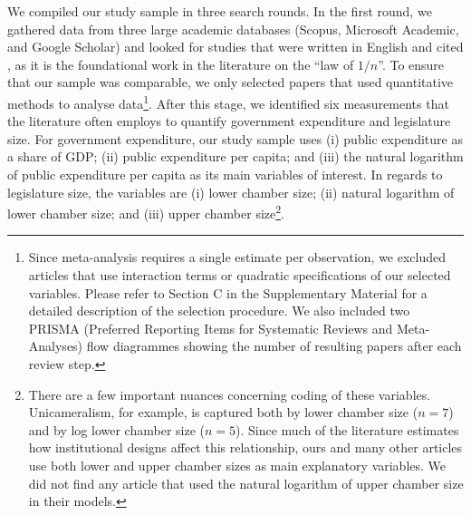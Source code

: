 \documentclass[11pt,a4paper,]{article}
\begin{document}
We compiled our study sample in three search rounds. In the first round,
we gathered data from three large academic databases (Scopus, Microsoft
Academic, and Google Scholar) and looked for studies that were written
in English and cited \citet{weingast1981political}, as it is the
foundational work in the literature on the ``law of \(1/n\)''. To ensure
that our sample was comparable, we only selected papers that used
quantitative methods to analyse
data\footnote{Since meta-analysis requires a single estimate per observation,
we excluded articles that use interaction terms or quadratic specifications of
our selected variables. Please refer to Section C in the Supplementary Material
for a detailed description of the selection procedure. We also included two
PRISMA (Preferred Reporting Items for Systematic Reviews and Meta-Analyses)
flow diagrammes \citep{liberati2009prisma} showing the number of resulting
papers after each review step.}. After this stage, we identified six
measurements that the literature often employs to quantify government
expenditure and legislature size. For government expenditure, our study
sample uses (i) public expenditure as a share of GDP; (ii) public
expenditure per capita; and (iii) the natural logarithm of public
expenditure per capita as its main variables of interest. In regards to
legislature size, the variables are (i) lower chamber size; (ii) natural
logarithm of lower chamber size; and (iii) upper chamber
size\footnote{There are a few important nuances concerning coding
of these variables. Unicameralism, for example, is captured both by lower
chamber size ($n = 7$) and by log lower chamber size ($n = 5$). Since much of
the literature estimates how institutional designs affect this relationship,
ours and many other articles use both lower and upper chamber sizes as main
explanatory variables. We did not find any article that used the natural
logarithm of upper chamber size in their models.}.
\end{document}
